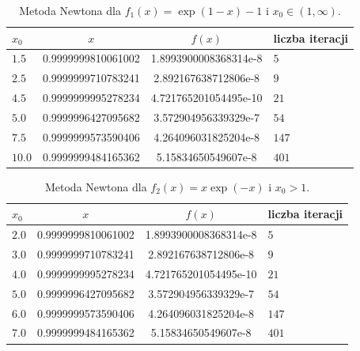 \documentclass{classrep}
\begin{document}
		\begin{table}[!hpbt]
        		\centering
        		\footnotesize
			\begin{tabular}{lSSl} \toprule
				{$x_0$} & {$x$} & {$f(x)$} & {liczba iteracji}\\ \midrule
				$1.5$ & 0.9999999810061002 & 1.8993900008368314e-8 & $5$ \\ 
				$2.5$ & 0.9999999710783241 & 2.892167638712806e-8 & $9$ \\
	 			$4.5$ & 0.9999999995278234 & 4.721765201054495e-10 & $21$ \\
	 			$5.0$ & 0.9999996427095682 & 3.572904956339329e-7 & $54$ \\
	 			$7.5$ & 0.9999999573590406 & 4.264096031825204e-8 & $147$ \\
	 			$10.0$ & 0.9999999484165362 & 5.15834650549607e-8 & $401$ \\ \bottomrule
	 		\end{tabular}
	 		\caption{Metoda Newtona dla $f_1(x)=\exp(1-x)-1$ i $x_0\in{(1,\infty)}$.}
			\label{table:5}			
		\end{table}	
		
		\begin{table}[!hpbt]
        		\centering
        		\footnotesize
			\begin{tabular}{lSSl} \toprule
				{$x_0$} & {$x$} & {$f(x)$} & {liczba iteracji}\\ \midrule
				$2.0$ & 0.9999999810061002 & 1.8993900008368314e-8 & $5$ \\ 
				$3.0$ & 0.9999999710783241 & 2.892167638712806e-8 & $9$ \\
	 			$4.0$ & 0.9999999995278234 & 4.721765201054495e-10 & $21$ \\
	 			$5.0$ & 0.9999996427095682 & 3.572904956339329e-7 & $54$ \\
	 			$6.0$ & 0.9999999573590406 & 4.264096031825204e-8 & $147$ \\
	 			$7.0$ & 0.9999999484165362 & 5.15834650549607e-8 & $401$ \\  \bottomrule
	 		\end{tabular}
	 		\caption{Metoda Newtona dla $f_2(x)=x\exp(-x)$ i $x_0>1$.}
			\label{table:6}			
		\end{table}	
\end{document}
